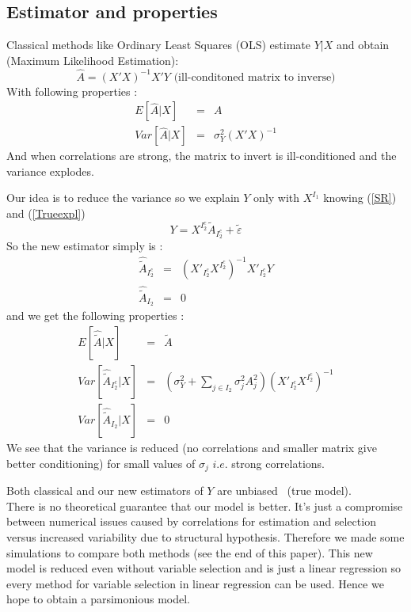 \documentclass[11pt,a4paper]{article}
\begin{document}
	\subsection{Estimator and properties}
	
	
		Classical methods like Ordinary Least Squares (OLS) estimate $Y|X$ and obtain (Maximum Likelihood Estimation): 
		\begin{equation}
			\hat A = (X'X)^{-1}X'Y \textrm{ (ill-conditoned matrix to inverse)}
		\end{equation}
		With following properties :
		\begin{eqnarray}
			E[\hat{A}|X]&=&A \\
			Var[\hat{A}|X]&=& \sigma_Y^2(X'X)^{-1}
		\end{eqnarray}				
		And when correlations are strong, the matrix to invert is ill-conditioned and the variance explodes.
 			
		Our idea is to reduce the variance so we explain $Y$ only with $X^{I_1}$ knowing (\ref{SR}) and (\ref{Trueexpl})
			\begin{equation}
				Y= X^{I_2^c}\tilde{A}_{I_2^c}+ \tilde{\varepsilon}\label{explicatif}
			\end{equation}							
		So the new estimator simply is : 
		\begin{eqnarray}
			\hat{\tilde{A}}_{I_2^c} &=& (X'_{I_2^c} X^{I_2^c})^{-1}X'_{I_2^c}Y \\
			\hat{\tilde{A}}_{I_2} &=& 0
		\end{eqnarray}
		and we get the following properties :
		\begin{eqnarray}
			E[\hat{\tilde{A}}|X]&=&\tilde{A} \\
			Var[\hat{\tilde{A}}_{I_2^c}|X]&=& (\sigma^2_Y+\sum_{j \in I_2}\sigma^2_{j}A_{j}^2 )(X'_{I_2^c} X^{I_2^c})^{-1} \\
			Var[\hat{\tilde{A}}_{I_2}|X]&=& 0 
		\end{eqnarray}
		We see that the variance is reduced (no correlations and smaller matrix give better conditioning) for small values of $\sigma_j$ $i.e.$ strong correlations.					
		
		Both classical and our new estimators of $Y$ are unbiased~\cite{saporta2006probabilites} (true model).
	\\
	
			There is no theoretical guarantee that our model is better. It's just a compromise between numerical issues caused by correlations for estimation and selection versus increased variability due to structural hypothesis. Therefore we made some simulations to compare both methods (see the end of this paper). This new model is reduced even without variable selection and is just a linear regression so every method for variable selection in linear regression can be used. Hence we hope to obtain a parsimonious model. 
		 \\			
			
\end{document}
